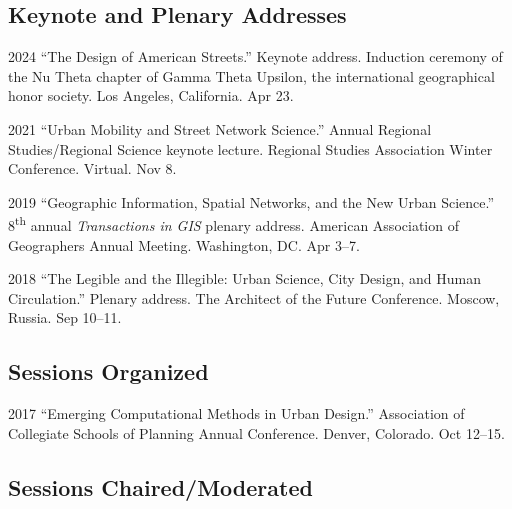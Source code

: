 \documentclass[11pt,letterpaper]{report} %
\begin{document}
    \subsection*{Keynote and Plenary Addresses}

    \begin{tablist}

        \item[2024] \tab{}\enquote{The Design of American Streets.} Keynote address. Induction ceremony of the Nu Theta chapter of Gamma Theta Upsilon, the international geographical honor society. Los Angeles, California. Apr 23.

        \item[2021] \tab{}\enquote{Urban Mobility and Street Network Science.} Annual Regional Studies/Regional Science keynote lecture. Regional Studies Association Winter Conference. Virtual. Nov 8.

        \item[2019] \tab{}\enquote{Geographic Information, Spatial Networks, and the New Urban Science.} 8\textsuperscript{th} annual \textit{Transactions in GIS} plenary address. American Association of Geographers Annual Meeting. Washington, DC\@. Apr 3--7.

        \item[2018] \tab{}\enquote{The Legible and the Illegible: Urban Science, City Design, and Human Circulation.} Plenary address. The Architect of the Future Conference. Moscow, Russia. Sep 10--11.

    \end{tablist}

    \subsection*{Sessions Organized}

    \begin{tablist}

        \item[2017] \tab{}\enquote{Emerging Computational Methods in Urban Design.} Association of Collegiate Schools of Planning Annual Conference. Denver, Colorado. Oct 12--15.

    \end{tablist}

    \subsection*{Sessions Chaired/Moderated}
\end{document}
